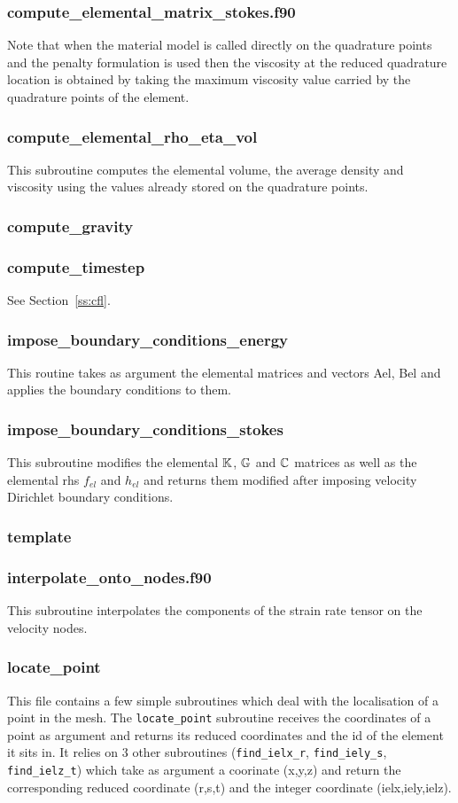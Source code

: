  \subsubsection{compute\_elemental\_matrix\_stokes.f90}
 Note that when the material model is called directly on the quadrature points and 
 the penalty formulation is used then the viscosity at the reduced quadrature location 
 is obtained by taking the maximum viscosity value carried by the quadrature points of 
 the element. 
 \subsubsection{compute\_elemental\_rho\_eta\_vol}
 This subroutine computes the elemental volume, the average density and 
 viscosity using the values already stored on the quadrature points. 
 \subsubsection{compute\_gravity}

 \subsubsection{compute\_timestep}
 See Section~\ref{ss:cfl}.
 \subsubsection{impose\_boundary\_conditions\_energy}
 This routine takes as argument the elemental matrices and vectors Ael, Bel
 and applies the boundary conditions to them.
 \subsubsection{impose\_boundary\_conditions\_stokes}
 This subroutine modifies the elemental ${\mathbb{K}}$, ${\mathbb{G}}$ and ${\mathbb{C}}$ matrices as well as the 
 elemental rhs $f_{el}$ and $h_{el}$ and returns them modified after imposing
 velocity Dirichlet boundary conditions.
 \subsubsection{template}

 \subsubsection{interpolate\_onto\_nodes.f90}
 This subroutine interpolates the components of the strain rate tensor on the velocity nodes.
 \subsubsection{locate\_point}
 This file contains a few simple subroutines which deal with the localisation of a point 
 in the mesh. The {\tt locate\_point} subroutine receives the coordinates of a point as argument 
 and returns its reduced coordinates and the id of the element it sits in.
 It relies on 3 other subroutines ({\tt find\_ielx\_r}, {\tt find\_iely\_s}, {\tt find\_ielz\_t})
 which take as argument a coorinate (x,y,z) and return the corresponding reduced
 coordinate (r,s,t) and the integer coordinate (ielx,iely,ielz).
